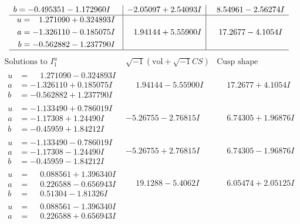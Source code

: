 \documentclass[1p]{elsarticle_modified}
\theoremstyle{definition}
\newcommand{\I}{\sqrt{-1}}
\begin{document}
$$\begin{array}{c|c|c}
\begin{aligned}
b &= -0.495351 - 1.172960 I\end{aligned}
 & -2.05097 + 2.54093 I & \phantom{-}8.54961 - 2.56274 I \\ \hline\begin{aligned}
u &= \phantom{-}1.271090 + 0.324893 I \\
a &= -1.326110 - 0.185075 I \\
b &= -0.562882 - 1.237790 I\end{aligned}
 & \phantom{-}1.94144 + 5.55900 I & \phantom{-}17.2677 - 4.1054 I\\
 \hline 
 \end{array}$$\newpage$$\begin{array}{c|c|c}  
\text{Solutions to }I^u_{1}& \I (\text{vol} + \sqrt{-1}CS) & \text{Cusp shape}\\
 \hline 
\begin{aligned}
u &= \phantom{-}1.271090 - 0.324893 I \\
a &= -1.326110 + 0.185075 I \\
b &= -0.562882 + 1.237790 I\end{aligned}
 & \phantom{-}1.94144 - 5.55900 I & \phantom{-}17.2677 + 4.1054 I \\ \hline\begin{aligned}
u &= -1.133490 + 0.786019 I \\
a &= -1.17308 + 1.24490 I \\
b &= -0.45959 + 1.84212 I\end{aligned}
 & -5.26755 - 2.76815 I & \phantom{-}6.74305 + 1.96876 I \\ \hline\begin{aligned}
u &= -1.133490 - 0.786019 I \\
a &= -1.17308 - 1.24490 I \\
b &= -0.45959 - 1.84212 I\end{aligned}
 & -5.26755 + 2.76815 I & \phantom{-}6.74305 - 1.96876 I \\ \hline\begin{aligned}
u &= \phantom{-}0.088561 + 1.396340 I \\
a &= \phantom{-}0.226588 - 0.656943 I \\
b &= \phantom{-}0.51304 - 1.81326 I\end{aligned}
 & \phantom{-}19.1288 - 5.4062 I & \phantom{-}6.05474 + 2.05125 I \\ \hline\begin{aligned}
u &= \phantom{-}0.088561 - 1.396340 I \\
a &= \phantom{-}0.226588 + 0.656943 I \\

\end{aligned}
\end{array}$$
\end{document}
